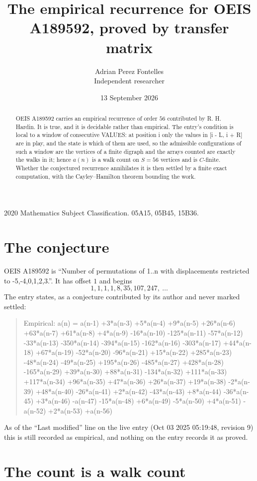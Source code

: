 \documentclass[11pt,a4paper]{article}
\title{The empirical recurrence for OEIS A189592, proved by transfer matrix}
\author{Adrian Perez Fontelles\\ \small Independent researcher}
\date{13 September 2026}
\theoremstyle{plain}
\theoremstyle{definition}
\begin{document}
\maketitle

\begin{abstract}
OEIS A189592 carries an empirical recurrence of order $56$ contributed by R. H. Hardin. It is
true, and it is decidable rather than empirical. The entry's condition is local to a window of consecutive VALUES: at position i only the values in [i - L, i + R] are in play, and the state is which of them are used, so
the admissible configurations of such a window are the vertices of a finite digraph and the
arrays counted are exactly the walks in it; hence $a(n)$ is a walk count on $S=56$ vertices
and is $C$-finite. Whether the conjectured recurrence annihilates it is then settled by a
finite exact computation, with the Cayley--Hamilton theorem bounding the work.
\end{abstract}

\noindent\small 2020 Mathematics Subject Classification. 05A15, 05B45, 15B36.\normalsize

\section{The conjecture}

OEIS A189592 is ``Number of permutations of 1..n with displacements restricted to {-5,-4,0,1,2,3}.''. It has offset $1$ and begins
\[
1, 1, 1, 1, 8, 35, 107, 247,\ \dots
\]
The entry states, as a conjecture contributed by its author and never marked settled:
\begin{quote}
Empirical: a(n) = a(n-1) +3*a(n-3) +5*a(n-4) +9*a(n-5) +26*a(n-6) +63*a(n-7) +61*a(n-8) +4*a(n-9) -16*a(n-10) -125*a(n-11) -57*a(n-12) -33*a(n-13) -350*a(n-14) -394*a(n-15) -162*a(n-16) -303*a(n-17) +44*a(n-18) +67*a(n-19) -52*a(n-20) -96*a(n-21) +15*a(n-22) +285*a(n-23) -48*a(n-24) -49*a(n-25) +195*a(n-26) -485*a(n-27) +428*a(n-28) -165*a(n-29) +39*a(n-30) +88*a(n-31) -134*a(n-32) +111*a(n-33) +117*a(n-34) +96*a(n-35) +47*a(n-36) +26*a(n-37) +19*a(n-38) -2*a(n-39) +48*a(n-40) -26*a(n-41) +2*a(n-42) -43*a(n-43) +8*a(n-44) -36*a(n-45) +3*a(n-46) -a(n-47) -15*a(n-48) +6*a(n-49) -5*a(n-50) +4*a(n-51) -a(n-52) +2*a(n-53) +a(n-56)
\end{quote}
As of the ``Last modified'' line on the live entry (Oct 03 2025 05:19:48, revision 9) this is still
recorded as empirical, and nothing on the entry records it as proved.

\section{The count is a walk count}
\end{document}
